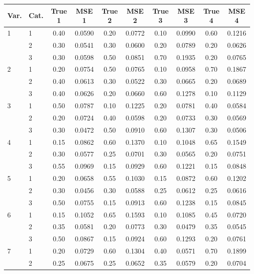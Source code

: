 \begin{longtable}{llcccccccc}
  \toprule
\textbf{Var.} & \textbf{Cat.} & \textbf{True 1} & \textbf{MSE 1} & \textbf{True 2} & \textbf{MSE 2} & \textbf{True 3} & \textbf{MSE 3} & \textbf{True 4} & \textbf{MSE 4} \\ 
  \midrule
1 & 1 & 0.40 & 0.0590 & 0.20 & 0.0772 & 0.10 & 0.0990 & 0.60 & 0.1216 \\ 
   & 2 & 0.30 & 0.0541 & 0.30 & 0.0600 & 0.20 & 0.0789 & 0.20 & 0.0626 \\ 
   & 3 & 0.30 & 0.0598 & 0.50 & 0.0851 & 0.70 & 0.1935 & 0.20 & 0.0765 \\ 
  2 & 1 & 0.20 & 0.0754 & 0.50 & 0.0765 & 0.10 & 0.0958 & 0.70 & 0.1867 \\ 
   & 2 & 0.40 & 0.0613 & 0.30 & 0.0522 & 0.30 & 0.0665 & 0.20 & 0.0689 \\ 
   & 3 & 0.40 & 0.0626 & 0.20 & 0.0660 & 0.60 & 0.1278 & 0.10 & 0.1129 \\ 
  3 & 1 & 0.50 & 0.0787 & 0.10 & 0.1225 & 0.20 & 0.0781 & 0.40 & 0.0584 \\ 
   & 2 & 0.20 & 0.0724 & 0.40 & 0.0598 & 0.20 & 0.0733 & 0.30 & 0.0569 \\ 
   & 3 & 0.30 & 0.0472 & 0.50 & 0.0910 & 0.60 & 0.1307 & 0.30 & 0.0506 \\ 
  4 & 1 & 0.15 & 0.0862 & 0.60 & 0.1370 & 0.10 & 0.1048 & 0.65 & 0.1549 \\ 
   & 2 & 0.30 & 0.0577 & 0.25 & 0.0701 & 0.30 & 0.0565 & 0.20 & 0.0751 \\ 
   & 3 & 0.55 & 0.0969 & 0.15 & 0.0929 & 0.60 & 0.1221 & 0.15 & 0.0848 \\ 
  5 & 1 & 0.20 & 0.0658 & 0.55 & 0.1030 & 0.15 & 0.0872 & 0.60 & 0.1202 \\ 
   & 2 & 0.30 & 0.0456 & 0.30 & 0.0588 & 0.25 & 0.0612 & 0.25 & 0.0616 \\ 
   & 3 & 0.50 & 0.0755 & 0.15 & 0.0913 & 0.60 & 0.1238 & 0.15 & 0.0845 \\ 
  6 & 1 & 0.15 & 0.1052 & 0.65 & 0.1593 & 0.10 & 0.1085 & 0.45 & 0.0720 \\ 
   & 2 & 0.35 & 0.0581 & 0.20 & 0.0773 & 0.30 & 0.0479 & 0.35 & 0.0545 \\ 
   & 3 & 0.50 & 0.0867 & 0.15 & 0.0924 & 0.60 & 0.1293 & 0.20 & 0.0761 \\ 
  7 & 1 & 0.20 & 0.0729 & 0.60 & 0.1304 & 0.40 & 0.0571 & 0.70 & 0.1899 \\ 
   & 2 & 0.25 & 0.0675 & 0.25 & 0.0652 & 0.35 & 0.0579 & 0.20 & 0.0704 \\ 

\end{longtable}
